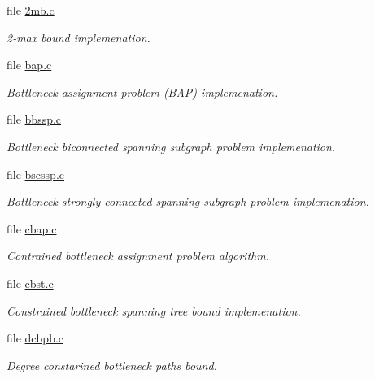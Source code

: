 \begin{CompactItemize}
\item 
file \hyperlink{lib_2lb_22mb_8c}{2mb.c}
\begin{CompactList}\small\item\em 2-max bound implemenation. \item\end{CompactList}

\item 
file \hyperlink{lib_2lb_2bap_8c}{bap.c}
\begin{CompactList}\small\item\em Bottleneck assignment problem (BAP) implemenation. \item\end{CompactList}

\item 
file \hyperlink{lib_2lb_2bbssp_8c}{bbssp.c}
\begin{CompactList}\small\item\em Bottleneck biconnected spanning subgraph problem implemenation. \item\end{CompactList}

\item 
file \hyperlink{lib_2lb_2bscssp_8c}{bscssp.c}
\begin{CompactList}\small\item\em Bottleneck strongly connected spanning subgraph problem implemenation. \item\end{CompactList}

\item 
file \hyperlink{lib_2lb_2cbap_8c}{cbap.c}
\begin{CompactList}\small\item\em Contrained bottleneck assignment problem algorithm. \item\end{CompactList}

\item 
file \hyperlink{lib_2lb_2cbst_8c}{cbst.c}
\begin{CompactList}\small\item\em Constrained bottleneck spanning tree bound implemenation. \item\end{CompactList}

\item 
file \hyperlink{lib_2lb_2dcbpb_8c}{dcbpb.c}
\begin{CompactList}\small\item\em Degree constarined bottleneck paths bound. \item\end{CompactList}


\end{CompactItemize}
